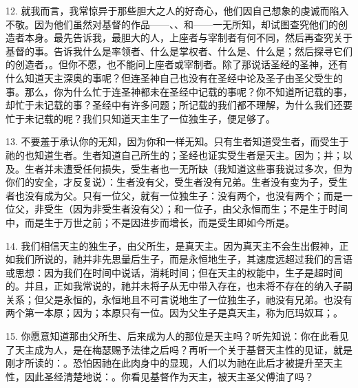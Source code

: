 12. 就我而言，我常惊异于那些胆大之人的好奇心，他们因自己想象的虔诚而陷入不敬。因为他们虽然对基督的作品——、、和——一无所知，却试图查究他们的创造者本身。最先告诉我，最胆大的人，上座者与宰制者有何不同，然后再查究关于基督的事。告诉我什么是率领者、什么是掌权者、什么是、什么是；然后探寻它们的创造者，。但你不愿，也不能问上座者或宰制者。除了那说话圣经的圣神，还有什么知道天主深奥的事呢？但连圣神自己也没有在圣经中论及圣子由圣父受生的事。那么，你为什么忙于连圣神都未在圣经中记载的事呢？你不知道所记载的事，却忙于未记载的事？圣经中有许多问题；所记载的我们都不理解，为什么我们还要忙于未记载的呢？我们只知道天主生了一位独生子，便足够了。\par

13. 不要羞于承认你的无知，因为你和一样无知。只有生者知道受生者，而受生于祂的也知道生者。生者知道自己所生的；圣经也证实受生者是天主。因为；并；以及。生者并未遭受任何损失，受生者也一无所缺（我知道这些事我说过多次，但为你们的安全，才反复说）：生者没有父，受生者没有兄弟。生者没有变为子，受生者也没有成为父。只有一位父，就有一位独生子：没有两个，也没有两个；而是一位父，非受生（因为非受生者没有父）；和一位子，由父永恒而生；不是生于时间中，而是生于万世之前；不是因进步而增长，而是受生即如今所是。\par

14. 我们相信天主的独生子，由父所生，是真天主。因为真天主不会生出假神，正如我们所说的，祂并非先思量后生子，而是永恒地生子，其速度远超过我们的言语或思想：因为我们在时间中说话，消耗时间；但在天主的权能中，生子是超时间的。并且，正如我常说的，祂并未将子从无中带入存在，也未将不存在的纳入子嗣关系；但父是永恒的，永恒地且不可言说地生了一位独生子，祂没有兄弟。也没有两个第一本原；因为；本原只有一位。因为父生子是真天主，称为厄玛奴耳；。\par

15. 你愿意知道那由父所生、后来成为人的那位是天主吗？听先知说：你在此看见了天主成为人，是在梅瑟赐予法律之后吗？再听一个关于基督天主性的见证，就是刚才所读的：。恐怕因祂在此肉身中的显现，人们以为祂在此后才被提升至天主性，因此圣经清楚地说：。你看见基督作为天主，被天主圣父傅油了吗？\par

